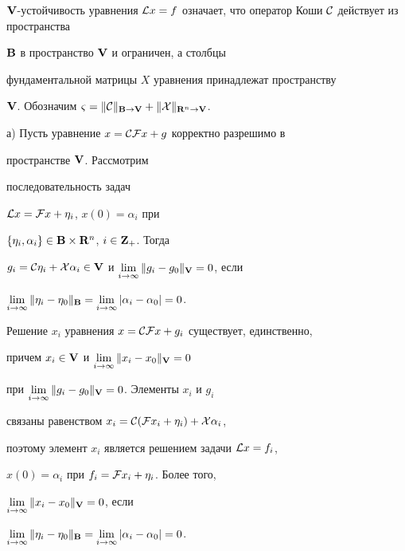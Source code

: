 \begin{pf}


$\spc{V}$-устойчивость уравнения ${\cal


L}x=f$ означает, что оператор Коши $\cal C$ действует из пространства


$\bold {B}$ в пространство $\bold {V}$ и ограничен, а столбцы


фундаментальной матрицы $X$ уравнения принадлежат пространству


$\spc{V}$. Обозначим $\varsigma=\|{\cal C}\|_{\bold{B}\to\bold{V}}+


\|{\cal X}\|_{\bold{R}^n\to\bold{V}}$.


\smallskip





а) Пусть уравнение $x={\cal C}{\cal F}x+g$ корректно разрешимо в


пространстве $\bold {V}$. Рассмотрим


последовательность задач


${\cal L}x={\cal F}x+\eta_i$, $x(0)=\alpha_i$ при


$\{\eta_i,\alpha_i\}\in\bold {B}\times\bold {R}^n$, $i\in\bold {Z}_+$. Тогда


$g_i={\cal C}\eta_i+{\cal X}\alpha_i\in\spc{V}$ и $\lim\limits_{i\to\infty}


\|g_i-g_0\|_{\bold V}=0$, если


$\lim\limits_{i\to\infty}\|\eta_i-\eta_0\|_{\bold B}=


\lim\limits_{i\to\infty}|\alpha_i-\alpha_0|=0$.


Решение $x_i$ уравнения $x={\cal C}{\cal F}x+g_i$ существует, единственно,


причем $x_i\in\bold {V}$ и $\lim\limits_{i\to\infty}\|x_i-x_0\|_{\bold V}=0$


при $\lim\limits_{i\to\infty}\|g_i-g_0\|_{\bold V}=0$. Элементы $x_i$ и $g_i$


связаны равенством $x_i={\cal C}({\cal F}x_i+\eta_i)+{\cal X}\alpha_i$,


поэтому элемент $x_i$ является решением задачи ${\cal L}x=f_i$,


$x(0)=\alpha_i$ при $f_i={\cal F}x_i+\eta_i$. Более того,


$\lim\limits_{i\to\infty}\|x_i-x_0\|_{\bold V}=0$, если


$\lim\limits_{i\to\infty}\|\eta_i-\eta_0\|_{\bold B}=


\lim\limits_{i\to\infty}|\alpha_i-\alpha_0|=0$.



\end{pf}
